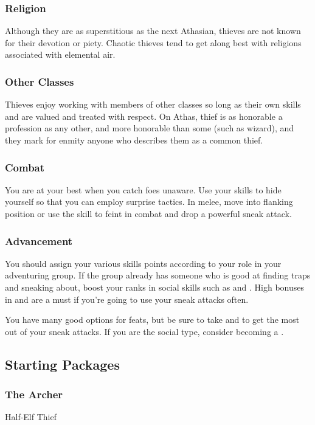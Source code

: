 \subsubsection{Religion}
Although they are as superstitious as the next Athasian, thieves are not known for their devotion or piety. Chaotic thieves tend to get along best with religions associated with elemental air.

\subsubsection{Other Classes}
Thieves enjoy working with members of other classes so long as their own skills and are valued and treated with respect. On Athas, thief is as honorable a profession as any other, and more honorable than some (such as wizard), and they mark for enmity anyone who describes them as a common thief.

\subsubsection{Combat}
You are at your best when you catch foes unaware. Use your skills to hide yourself so that you can employ surprise tactics. In melee, move into flanking position or use the  skill to feint in combat and drop a powerful sneak attack.

\subsubsection{Advancement}
You should assign your various skills points according to your role in your adventuring group. If the group already has someone who is good at finding traps and sneaking about, boost your ranks in social skills such as  and . High bonuses in  and  are a must if you're going to use your sneak attacks often.

You have many good options for feats, but be sure to take  and  to get the most out of your sneak attacks.  If you are the social type, consider becoming a .

\subsection{Starting Packages}
\subsubsection{The Archer}
Half-Elf Thief

